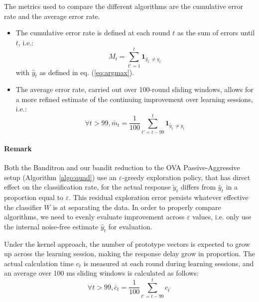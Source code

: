 \documentclass[preprint,12pt,authoryear]{elsarticle}
\begin{document}
The metrics used to compare the different algorithms are the cumulative error rate and the average error rate. 
\begin{itemize}
\item The cumulative error rate is defined at each round $t$ as the sum of errors until $t$, i.e.:
$$M_t = \sum_{t'=1}^t \mathbf{1}_{\hat{y}_{t^\prime}\neq y_{t^\prime}} $$
with $\hat{y}_t$ as defined in eq. (\ref{eq:argmax}).
\item The average error rate, carried out over 100-round sliding windows, allows for a more refined estimate of the continuing improvement over learning sessions, i.e.:
$$\forall t>99, \bar{m}_t = \frac{1}{100} \sum_{t'=t - 99}^t \mathbf{1}_{\hat{y}_{t^\prime}\neq y_{t^\prime}}$$
\end{itemize}

\paragraph{Remark} Both the Banditron and our bandit reduction to the OVA Passive-Aggressive setup (Algorithm \ref{algo:quad}) use an $\varepsilon$-greedy exploration policy, that has direct effect on the  classification rate, for the actual response  $\tilde{y}_t$ differs from $\hat{y}_t$ in a proportion equal to $\varepsilon$. This residual exploration error persists whatever effective the classifier $W$ is at separating the data. In order to properly compare algorithms, we need to evenly evaluate improvement across $\varepsilon$ values, i.e. only use the internal noise-free estimate $\hat{y}_t$ for evaluation.


Under the kernel approach, the number of prototype vectors is expected to grow up across the learning session, making the response delay grow in proportion. The actual calculation time $c_t$ is measured at each round during learning sessions, and an average over 100 ms sliding windows is calculated as follows:
 $$\forall t>99, \bar{c}_t = \frac{1}{100} \sum_{t'=t - 99}^t c_{t^\prime}$$
\end{document}
